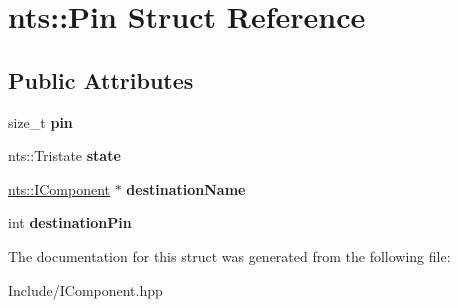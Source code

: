 \hypertarget{structnts_1_1Pin}{}\section{nts\+:\+:Pin Struct Reference}
\label{structnts_1_1Pin}
\subsection*{Public Attributes}
\begin{DoxyCompactItemize}
\item 
\mbox{\label{structnts_1_1Pin_a56bb48d55a0e6d822f6260d107cb54ba}} 
size\+\_\+t {\bfseries pin}
\item 
\mbox{\label{structnts_1_1Pin_a0a84d871606d7f334bee3ff83c265890}} 
nts\+::\+Tristate {\bfseries state}
\item 
\mbox{\label{structnts_1_1Pin_a41da0646d485e2482cefc5b399c781d8}} 
\mbox{\hyperlink{classnts_1_1IComponent}{nts\+::\+I\+Component}} $\ast$ {\bfseries destination\+Name}
\item 
\mbox{\label{structnts_1_1Pin_a198cbbf53016027c3352d4150895e7d7}} 
int {\bfseries destination\+Pin}
\end{DoxyCompactItemize}


The documentation for this struct was generated from the following file\+:\begin{DoxyCompactItemize}
\item 
Include/I\+Component.\+hpp\end{DoxyCompactItemize}
